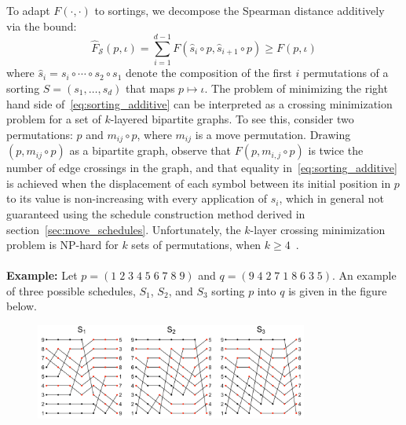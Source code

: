 \documentclass[sn-mathphys]{sn-jnl}
\DeclareMathOperator*{\argmin}{arg\,min}
\begin{document}
To adapt $F(\cdot, \cdot)$ to sortings, we decompose the Spearman distance additively via the bound:
\begin{equation}\label{eq:sorting_additive}
\hat{F}_{\mathcal{S}}(p, \iota) = \sum\limits_{i=1}^{d-1} F(\hat{s}_i \circ p, \hat{s}_{i+1} \circ p) \geq F(p, \iota)
\end{equation}
where $\hat{s}_i =  s_i \circ \cdots \circ s_2 \circ s_1$ denote the composition of the first $i$ permutations of a sorting  $S = (s_1, \dots, s_d)$ that maps $p \mapsto \iota$.
The problem of minimizing the right hand side of~\eqref{eq:sorting_additive} can be interpreted as a crossing minimization problem for a set of $k$-layered bipartite graphs. To see this, consider two permutations: $p$ and $m_{ij} \circ p$, where $m_{ij}$ is a move permutation. Drawing $(p, m_{ij} \circ p)$ as a bipartite graph,  observe that $F(p, m_{i,j} \circ p)$ is twice the number of edge crossings in the graph, and that equality in~\eqref{eq:sorting_additive} is achieved when the displacement of each symbol between its initial position in $p$ to its value is non-increasing with every application of $s_i$, which in general not guaranteed using the schedule construction method derived in section~\ref{sec:move_schedules}. Unfortunately, the $k$-layer crossing minimization problem is NP-hard for $k$ sets of permutations, when $k \geq 4$~\cite{biedl2009complexity}. 
\\
\\
\noindent \textbf{Example:} 
Let  $p= (1\;2\;3\;4\;5\;6\;7\;8\;9)$ and $q = (9\;4\;2\;7\;1\;8\;6\;3\;5)$.
An example of three possible schedules, $S_1$, $S_2$, and $S_3$ sorting $p$ into $q$ is given in the figure below. 
\begin{figure}[!htb]
    \centering
    \includegraphics[width=0.80\textwidth]{crossings.png}
    \label{fig:crossings}
\end{figure}
\end{document}

